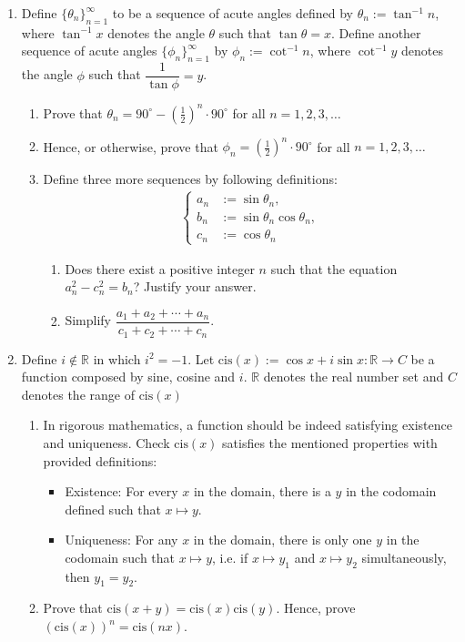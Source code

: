 \documentclass[12pt]{article}
\newcommand{\cis}[1]{\mathrm{cis}({#1})}
\begin{document}
    \begin{enumerate}
        \item Define $\{\theta_n\}_{n=1}^{\infty}$ to be a sequence of acute angles defined by $\theta_n:= \tan^{-1}{n}$, where $\tan^{-1}{x}$ denotes the angle $\theta$ such that $\tan{\theta}=x$. Define another sequence of acute angles $\{\phi_n\}_{n=1}^{\infty}$ by $\phi_n:= \cot^{-1}{n}$, where $\cot^{-1}{y}$ denotes the angle $\phi$ such that $\dfrac{1}{\tan{\phi}}=y$.\begin{enumerate}
            \item Prove that $\theta_n=90^\circ - (\frac{1}{2})^n \cdot 90^\circ$ for all $n=1,2,3,\dots$
            \item Hence, or otherwise, prove that $\phi_n = (\frac{1}{2})^n \cdot 90^\circ$ for all $n=1,2,3,\dots$
            \item Define three more sequences by following definitions: \begin{align*}
                \begin{cases}
                    a_n &:= \sin{\theta_n},\\
                    b_n &:= \sin{\theta_n}\cos{\theta_n},\\
                    c_n &:= \cos{\theta_n}
                \end{cases}
            \end{align*}\begin{enumerate}
                \item Does there exist a positive integer $n$ such that the equation $a_n^2-c_n^2=b_n$? Justify your answer.
                \item Simplify $\dfrac{a_1+a_2+\cdots+a_n}{c_1+c_2+\cdots+c_n}$.
            \end{enumerate}
        \end{enumerate}
        \item Define $i\notin \mathbb{R}$ in which $i^2=-1$. Let $\cis{x}:=\cos{x}+i\sin{x}:\mathbb{R}\to C$ be a function composed by sine, cosine and $i$. $\mathbb{R}$ denotes the real number set and $C$ denotes the range of $\cis{x}$ \begin{enumerate}
            \item In rigorous mathematics, a function should be indeed satisfying existence and uniqueness. Check $\cis{x}$ satisfies the mentioned properties with provided definitions:\begin{itemize}
                \item Existence: For every $x$ in the domain, there is a $y$ in the codomain defined such that $x\mapsto y$.
                \item Uniqueness: For any $x$ in the domain, there is only one $y$ in the codomain such that $x\mapsto y$, i.e. if $x\mapsto y_1$ and $x\mapsto y_2$ simultaneously, then $y_1=y_2$. 
            \end{itemize}
            \item Prove that $\cis{x+y}=\cis{x}\cis{y}$. Hence, prove $(\cis{x})^n=\cis{nx}$.
        \end{enumerate}
    \end{enumerate}
\end{document}
